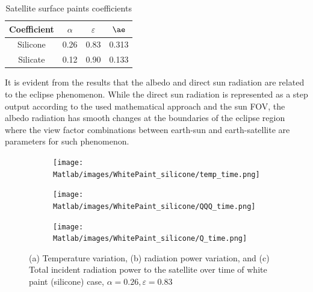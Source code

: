 \documentclass[11pt]{article}
\begin{document}
\begin{table}[H]
    \centering
    \caption{Satellite surface paints coefficients}
    \begin{tabular}{c |c c c}
    \hline
        Coefficient & $\alpha$ & $\varepsilon$ & $\ae$ \\ \hline
        Silicone &  0.26 & 0.83 & 0.313 \\
         Silicate & 0.12&0.90 & 0.133  \\ \hline
    \end{tabular}
    \label{tb:01}
\end{table}

It is evident from the results that the albedo and direct sun radiation are related to the eclipse phenomenon. While the direct sun radiation is represented as a step output according to the used mathematical approach and the sun \ac{FOV}, the albedo radiation has smooth changes at the boundaries of the eclipse region where the view factor combinations between earth-sun and earth-satellite are parameters for such phenomenon. 



 

\begin{figure}[H]
    \centering
    \begin{subfigure}[b]{1\textwidth}
        \texttt{[image: Matlab/images/WhitePaint\_silicone/temp\_time.png]}
        \caption{}
        \label{fig:temptime1}
    \end{subfigure}
    \begin{subfigure}[b]{1\textwidth}
        \texttt{[image: Matlab/images/WhitePaint\_silicone/QQQ\_time.png]}
        \caption{}
        \label{fig:QQQtimme1}
    \end{subfigure}
    \begin{subfigure}[b]{1\textwidth}
        \texttt{[image: Matlab/images/WhitePaint\_silicone/Q\_time.png]}
        \caption{}
        \label{fig:Qtimme1}
    \end{subfigure}
    \caption{(a) Temperature variation, (b) radiation power variation, and (c) Total incident radiation power to the satellite over time of white paint (silicone) case, $\alpha=0.26, \varepsilon = 0.83$}
\end{figure}
\end{document}
